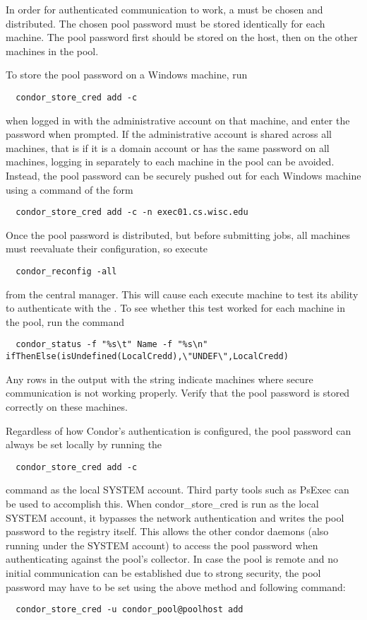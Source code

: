 In order for  authenticated communication to work,
a  must be chosen and distributed.
The chosen pool password must be stored identically for each machine.
The pool password first should be
stored on the  host, then on the other machines in the pool.

To store the pool password on a Windows machine, run
\begin{verbatim}
  condor_store_cred add -c
\end{verbatim}
when logged in with the administrative account on that machine,
and enter the password when prompted. 
If the administrative account is shared across all machines,
that is if it is a domain account or has the same password on all machines,
logging in separately to each machine in the pool can be avoided.
Instead, the pool password can be securely pushed out for each Windows machine
using a command of the form
\begin{verbatim}
  condor_store_cred add -c -n exec01.cs.wisc.edu
\end{verbatim}

Once the pool password is distributed, 
but before submitting jobs,
all machines must reevaluate their configuration,
so execute
\begin{verbatim}
  condor_reconfig -all
\end{verbatim}
from the central manager.
This will cause each execute machine to test its ability
to authenticate with the .
To see whether this test worked for each machine in the pool, run the command
\footnotesize
\begin{verbatim}
  condor_status -f "%s\t" Name -f "%s\n" ifThenElse(isUndefined(LocalCredd),\"UNDEF\",LocalCredd)
\end{verbatim}
\normalsize
Any rows in the output with the  string indicate machines where
secure communication is not working properly. Verify that the pool password
is stored correctly on these machines.

Regardless of how Condor's authentication is configured, the pool password can 
always be set locally by running the 
\begin{verbatim}
  condor_store_cred add -c
\end{verbatim}
command as the local SYSTEM account. Third party tools such as PsExec can be 
used to accomplish this. When condor_store_cred is run as the local SYSTEM 
account, it bypasses the network authentication and writes the pool password 
to the registry itself. This allows the other condor daemons (also running
under the SYSTEM account) to access the pool password when authenticating
against the pool's collector. 
In case the pool is remote and no initial communication can be established 
due to strong security, the pool password may have to be set using the
above method and following command:
\begin{verbatim}
  condor_store_cred -u condor_pool@poolhost add
\end{verbatim}

